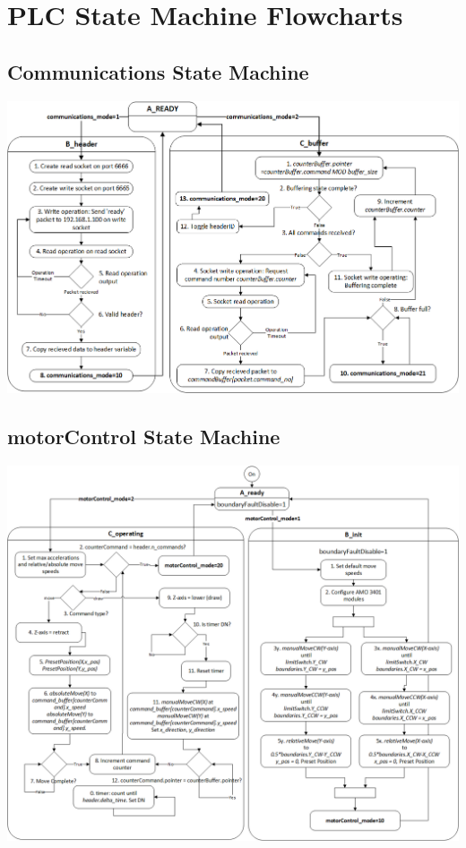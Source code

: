 \chapter{PLC State Machine Flowcharts}
\label{ch:PLC-flowcharts}


\section{Communications State Machine}
\label{sec:PLC-flowcharts-comms}

	\begin{center}
		\includegraphics[width=\textwidth]{figures/cncMachine/communications}
		\label{fig:communicationsStates}
	\end{center}

\section{motorControl State Machine}
\label{sec:PLC-flowcharts-motor}
	\begin{center}
		\includegraphics[width=\textwidth]{figures/cncMachine/motorControl}
		\label{fig:motorControlStates}
	\end{center}

